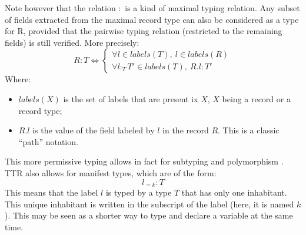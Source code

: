 \documentclass[11pt]{article}
\begin{document}
				Note however that the relation $:$ is a kind of maximal typing relation. Any subset of fields extracted from the maximal record type can also be considered as a type for R, provided that the pairwise typing relation (restricted to the remaining fields) is still verified. More precisely:
				\begin{equation*}
					R : T \iff \left\lbrace\begin{array}{l}
					\forall l \in labels(T), \ l \in labels(R) \\
					\forall l :_T T' \in labels(T), \ R.l : T'
					\end{array}\right.
				\end{equation*}
				Where:
				\begin{itemize}
					\item $labels(X)$ is the set of labels that are present ix $X$, $X$ being a record or a record type;
					\item $R.l$ is the value of the field labeled by $l$ in the record $R$. This is a classic ``path'' notation.
				\end{itemize}
				This more permissive typing allows in fact for subtyping and polymorphism \cite{cooper2005}.\\
				
				TTR also allows for manifest types, which are of the form:
				\begin{equation*}
					l_{=k} : T
				\end{equation*}
				This means that the label $l$ is typed by a type $T$ that has only one inhabitant. This unique inhabitant is written in the subscript of the label (here, it is named $k$). This may be seen as a shorter way to type and declare a variable at the same time.
\end{document}
